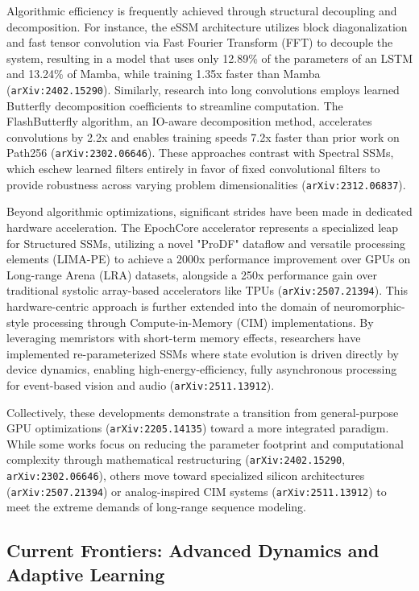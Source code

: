 \documentclass[11pt]{article}
\begin{document}
Algorithmic efficiency is frequently achieved through structural decoupling and decomposition. For instance, the eSSM architecture utilizes block diagonalization and fast tensor convolution via Fast Fourier Transform (FFT) to decouple the system, resulting in a model that uses only 12.89\% of the parameters of an LSTM and 13.24\% of Mamba, while training 1.35x faster than Mamba (\texttt{arXiv:2402.15290}). Similarly, research into long convolutions employs learned Butterfly decomposition coefficients to streamline computation. The FlashButterfly algorithm, an IO-aware decomposition method, accelerates convolutions by 2.2x and enables training speeds 7.2x faster than prior work on Path256 (\texttt{arXiv:2302.06646}). These approaches contrast with Spectral SSMs, which eschew learned filters entirely in favor of fixed convolutional filters to provide robustness across varying problem dimensionalities (\texttt{arXiv:2312.06837}).

Beyond algorithmic optimizations, significant strides have been made in dedicated hardware acceleration. The EpochCore accelerator represents a specialized leap for Structured SSMs, utilizing a novel "ProDF" dataflow and versatile processing elements (LIMA-PE) to achieve a 2000x performance improvement over GPUs on Long-range Arena (LRA) datasets, alongside a 250x performance gain over traditional systolic array-based accelerators like TPUs (\texttt{arXiv:2507.21394}). This hardware-centric approach is further extended into the domain of neuromorphic-style processing through Compute-in-Memory (CIM) implementations. By leveraging memristors with short-term memory effects, researchers have implemented re-parameterized SSMs where state evolution is driven directly by device dynamics, enabling high-energy-efficiency, fully asynchronous processing for event-based vision and audio (\texttt{arXiv:2511.13912}).

Collectively, these developments demonstrate a transition from general-purpose GPU optimizations (\texttt{arXiv:2205.14135}) toward a more integrated paradigm. While some works focus on reducing the parameter footprint and computational complexity through mathematical restructuring (\texttt{arXiv:2402.15290}, \texttt{arXiv:2302.06646}), others move toward specialized silicon architectures (\texttt{arXiv:2507.21394}) or analog-inspired CIM systems (\texttt{arXiv:2511.13912}) to meet the extreme demands of long-range sequence modeling.

\subsection{Current Frontiers: Advanced Dynamics and Adaptive Learning}
\end{document}
